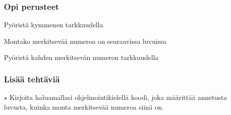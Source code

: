 \begin{tehtavasivu}
\subsubsection*{Opi perusteet}

\begin{tehtava}
Pyöristä kymmenen tarkkuudella
\begin{vastaus}
\end{vastaus}
\end{tehtava}

\begin{tehtava}
Montako merkitsevää numeroa on seuraavissa luvuissa
	\begin{vastaus}
	\end{vastaus}
\end{tehtava}

\begin{tehtava}
Pyöristä kahden merkitsevän numeron tarkkuudella
	\begin{vastaus}
	\end{vastaus}
\end{tehtava}



\subsubsection*{Lisää tehtäviä}

\begin{tehtava}
$\star$ Kirjoita haluamallasi ohjelmointikielellä koodi, joka määrittää annetusta luvusta, kuinka monta merkitsevää numeroa siinä on.
\end{tehtava}

\end{tehtavasivu}